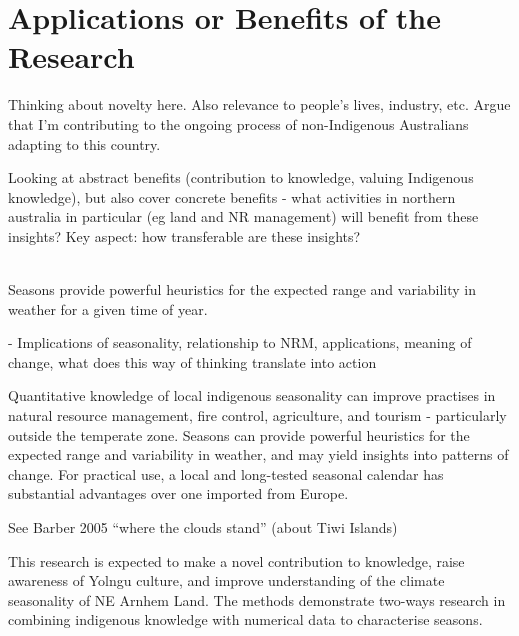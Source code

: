 


\section{Applications or Benefits of the Research}
\label{sec:applications-benefits}

Thinking about novelty here.  Also relevance to people's lives,
industry, etc.  Argue that I'm contributing to the ongoing process
of non-Indigenous Australians adapting to this country.

Looking at abstract benefits (contribution to knowledge, valuing Indigenous knowledge),
but also cover concrete benefits - what activities in northern australia
in particular (eg land and NR management) will benefit from these insights?
Key aspect: how transferable are these insights?

~\\

Seasons provide powerful heuristics for the expected range and variability in
weather for a given time of year.

-	Implications of seasonality, relationship to NRM, applications, meaning of
change, what does this way of thinking translate into action


Quantitative knowledge of local indigenous seasonality can improve practises in
natural resource management, fire control, agriculture, and tourism -
particularly outside the temperate zone.  Seasons can provide powerful
heuristics for the expected range and variability in weather, and may yield
insights into patterns of change.  For practical use, a local and long-tested
seasonal calendar has substantial advantages over one imported from Europe.


See Barber 2005 ``where the clouds stand'' (about Tiwi Islands)

This research is expected to make a novel contribution to knowledge, raise
awareness of Yolngu culture, and improve understanding of the climate
seasonality of NE Arnhem Land.  The methods demonstrate two-ways research in
combining indigenous knowledge with numerical data to characterise seasons.

